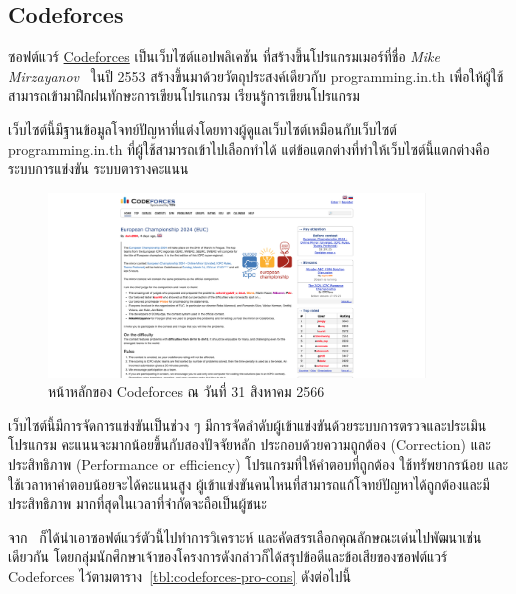 \documentclass[12pt,one side,openright,a4paper]{cpe-thesis-th}
\newcommand{\thaijustify}[1]{%
  \par\hspace{30pt}\justifying
  #1
}
\begin{document}
\subsection{Codeforces}
\thaijustify{
  ซอฟต์แวร์ \href{https://codeforces.com}{Codeforces} เป็นเว็บไซต์แอปพลิเคชัน ที่สร้างขึ้นโปรแกรมเมอร์ที่ชื่อ \textit{Mike Mirzayanov}~\cite{codeforces} ในปี 2553 สร้างขึ้นมาด้วยวัตถุประสงค์เดียวกับ programming.in.th เพื่อให้ผู้ใช้สามารถเข้ามาฝึกฝนทักษะการเขียนโปรแกรม เรียนรู้การเขียนโปรแกรม
}
\thaijustify{
  เว็บไซต์นี้มีฐานข้อมูลโจทย์ปัญหาที่แต่งโดยทางผู้ดูแลเว็บไซต์เหมือนกับเว็บไซต์ programming.in.th ที่ผู้ใช้สามารถเข้าไปเลือกทำได้ แต่ข้อแตกต่างที่ทำให้เว็บไซต์นี้แตกต่างคือระบบการแข่งขัน ระบบตารางคะแนน
}
\begin{figure}[H]
  \centering
  \includegraphics[width=10cm]{figure/literature/codeforces.png}
  \caption[หน้าหลักของ Codeforces]{หน้าหลักของ Codeforces ณ วันที่ 31 สิงหาคม 2566~\cite{codeforces}}\label{fig:codeforces-page}
\end{figure}
\thaijustify{
  เว็บไซต์นี้มีการจัดการแข่งขันเป็นช่วง ๆ มีการจัดลำดับผู้เข้าแข่งขันด้วยระบบการตรวจและประเมินโปรแกรม คะแนนจะมากน้อยขึ้นกับสองปัจจัยหลัก ประกอบด้วยความถูกต้อง (Correction) และประสิทธิภาพ (Performance or efficiency) โปรแกรมที่ให้คำตอบที่ถูกต้อง ใช้ทรัพยากรน้อย และใช้เวลาหาคำตอบน้อยจะได้คะแนนสูง ผู้เข้าแข่งขันคนไหนที่สามารถแก้โจทย์ปัญหาได้ถูกต้องและมีประสิทธิภาพ มากที่สุดในเวลาที่จำกัดจะถือเป็นผู้ชนะ
}
\thaijustify{
  จาก~\cite{nattawat20pgs} ก็ได้นำเอาซอฟต์แวร์ตัวนี้ไปทำการวิเคราะห์ และคัดสรรเลือกคุณลักษณะเด่นไปพัฒนาเช่นเดียวกัน โดยกลุ่มนักศึกษาเจ้าของโครงการดังกล่าวก็ได้สรุปข้อดีและข้อเสียของซอฟต์แวร์ Codeforces ไว้ตามตาราง~\ref{tbl:codeforces-pro-cons} ดังต่อไปนี้
}
\end{document}
